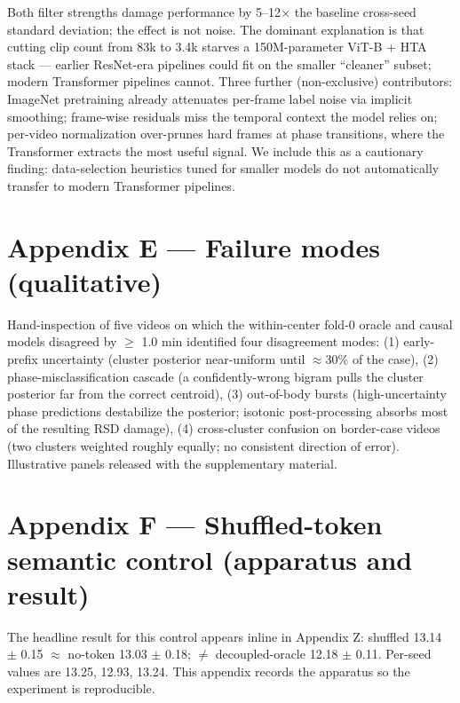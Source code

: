 Both filter strengths damage performance by 5--12$\times$ the baseline
cross-seed standard deviation; the effect is not noise. The dominant
explanation is that cutting clip count from 83k to 3.4k starves a
150M-parameter ViT-B + HTA stack --- earlier ResNet-era pipelines could
fit on the smaller ``cleaner'' subset; modern Transformer pipelines
cannot. Three further (non-exclusive) contributors: ImageNet pretraining
already attenuates per-frame label noise via implicit smoothing;
frame-wise residuals miss the temporal context the model relies on;
per-video normalization over-prunes hard frames at phase transitions,
where the Transformer extracts the most useful signal. We include this
as a cautionary finding: data-selection heuristics tuned for smaller
models do not automatically transfer to modern Transformer pipelines.

\section{Appendix E --- Failure modes (qualitative)}\label{appendix-e-failure-modes-qualitative}

Hand-inspection of five videos on which the within-center fold-0 oracle
and causal models disagreed by $\geq$ 1.0 min identified four disagreement
modes: (1) early-prefix uncertainty (cluster posterior near-uniform
until $\approx$30\% of the case), (2) phase-misclassification cascade (a
confidently-wrong bigram pulls the cluster posterior far from the
correct centroid), (3) out-of-body bursts (high-uncertainty phase
predictions destabilize the posterior; isotonic post-processing absorbs
most of the resulting RSD damage), (4) cross-cluster confusion on
border-case videos (two clusters weighted roughly equally; no consistent
direction of error). Illustrative panels released with the supplementary
material.

\section{Appendix F --- Shuffled-token semantic control (apparatus and result)}\label{appendix-f-shuffled-token-semantic-control-apparatus-and-result}

The headline result for this control appears inline in Appendix Z:
shuffled 13.14 $\pm$ 0.15 $\approx$ no-token 13.03 $\pm$ 0.18; $\neq$ decoupled-oracle 12.18
$\pm$ 0.11. Per-seed values are 13.25, 12.93, 13.24. This appendix records
the apparatus so the experiment is reproducible.

